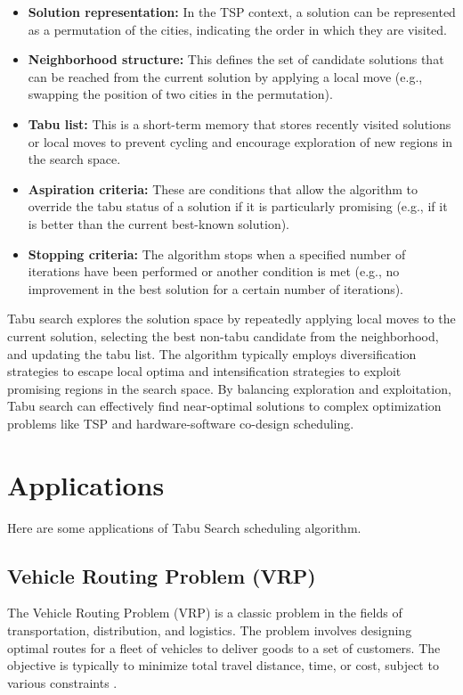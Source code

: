 \documentclass[conference]{IEEEtran}
\begin{document}
\begin{itemize}
\item \textbf{Solution representation:}
In the TSP context, a solution can be represented as a permutation of the cities, indicating the order in which they are visited.
\item \textbf{Neighborhood structure:}
This defines the set of candidate solutions that can be reached from the current solution by applying a local move (e.g., swapping the position of two cities in the permutation).
\item \textbf{Tabu list:}
This is a short-term memory that stores recently visited solutions or local moves to prevent cycling and encourage exploration of new regions in the search space.
\item \textbf{Aspiration criteria:}
These are conditions that allow the algorithm to override the tabu status of a solution if it is particularly promising (e.g., if it is better than the current best-known solution).
\item \textbf{Stopping criteria:} The algorithm stops when a specified number of iterations have been performed or another condition is met (e.g., no improvement in the best solution for a certain number of iterations).
\end{itemize}

Tabu search explores the solution space by repeatedly applying local moves to the current solution, selecting the best non-tabu candidate from the neighborhood, and updating the tabu list. The algorithm typically employs diversification strategies to escape local optima and intensification strategies to exploit promising regions in the search space. By balancing exploration and exploitation, Tabu search can effectively find near-optimal solutions to complex optimization problems like TSP and hardware-software co-design scheduling.

\section{Applications}
Here are some applications of Tabu Search scheduling algorithm.

\subsection{Vehicle Routing Problem (VRP)}
The Vehicle Routing Problem (VRP) is a classic problem in the fields of transportation, distribution, and logistics. The problem involves designing optimal routes for a fleet of vehicles to deliver goods to a set of customers. The objective is typically to minimize total travel distance, time, or cost, subject to various constraints \cite{gendreau1994tabu}.
\end{document}
